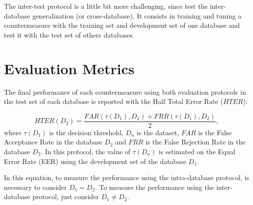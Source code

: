 The inter-test protocol is a little bit more challenging, since test the inter-database generalization (or cross-database). It consists in training and tuning a countermeasure with the training set and development set of one database and test it with the test set of others databases. 






\section{Evaluation Metrics}
\label{sec:Metrics}

The final performance of each countermeasure using both evaluation protocols in the test set of each database is reported with the Half Total Error Rate ($HTER$): 

\begin{equation}
\label{eq:HTER}
HTER(D_2)=\frac{FAR(\tau(D_1),D_2)+ FRR(\tau(D_1),D_2)} {2} ,
\end{equation}
where $\tau(D_1)$ is the decision threshold, $D_n$ is the dataset, $FAR$ is the False Acceptance Rate in the database $D_2$ and $FRR$ is the False Rejection Rate in the database $D_2$. In this protocol, the value of $\tau(D_n)$ is estimated on the Equal Error Rate (EER) using the development set of the database $D_1$. 

In this equation, to measure the performance using the intra-database protocol, is necessary to consider $D_1 = D_2$. To measure the performance using the inter-database protocol, just consider $D_1 \neq D_2$.



